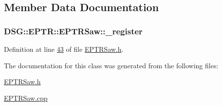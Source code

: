\subsection{Member Data Documentation}
\hypertarget{class_d_s_g_1_1_e_p_t_r_1_1_e_p_t_r_saw_a38d89a4557f487e0e447e1da6acf7e5f}{
\subsubsection[{\+\_\+register}]{ D\+S\+G\+::\+E\+P\+T\+R\+::\+E\+P\+T\+R\+Saw\+::\+\_\+register\hspace{0.3cm}{\ttfamily [protected]}}}\label{class_d_s_g_1_1_e_p_t_r_1_1_e_p_t_r_saw_a38d89a4557f487e0e447e1da6acf7e5f}


Definition at line \hyperlink{_e_p_t_r_saw_8h_source_l00043}{43} of file \hyperlink{_e_p_t_r_saw_8h_source}{E\+P\+T\+R\+Saw.\+h}.



The documentation for this class was generated from the following files\+:\begin{DoxyCompactItemize}
\item 
\hyperlink{_e_p_t_r_saw_8h}{E\+P\+T\+R\+Saw.\+h}\item 
\hyperlink{_e_p_t_r_saw_8cpp}{E\+P\+T\+R\+Saw.\+cpp}\end{DoxyCompactItemize}
